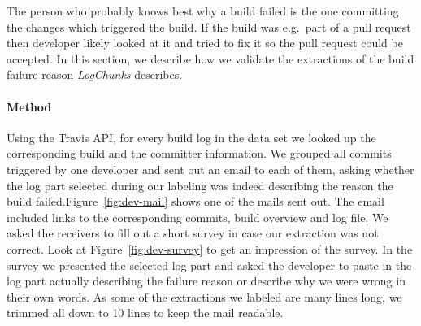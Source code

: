\documentclass[\myrootdir/main.tex]{subfiles}
\begin{document}
The person who probably knows best why a build failed is the one committing the changes which triggered the build.
If the build was e.g.\ part of a pull request then developer likely looked at it and tried to fix it so the pull request could be accepted.
In this section, we describe how we validate the extractions of the build failure reason \emph{LogChunks} describes.

\paragraph{Method}
Using the Travis API, for every build log in the data set we looked up the corresponding build and the committer information.
We grouped all commits triggered by one developer and sent out an email to each of them, asking whether the log part selected during our labeling was indeed describing the reason the build failed.Figure~\ref{fig:dev-mail} shows one of the mails sent out.
The email included links to the corresponding commits, build overview and log file.
We asked the receivers to fill out a short survey in case our extraction was not correct.
Look at Figure~\ref{fig:dev-survey} to get an impression of the survey.
In the survey we presented the selected log part and asked the developer to paste in the log part actually describing the failure reason or describe why we were wrong in their own words.
As some of the extractions we labeled are many lines long, we trimmed all down to 10 lines to keep the mail readable.
\end{document}
